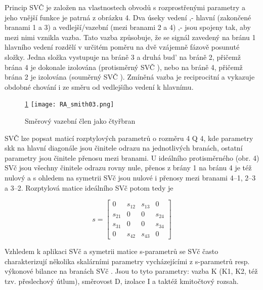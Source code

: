         Princip SVČ je založen na vlastnostech obvodů s rozprostřenými parametry a jeho vnější 
        funkce je patrná z obrázku 4. Dva úseky vedení ‚- hlavní (zakončené branami 1 a 3) a 
        vedlejší/vazební (mezi branami 2 a 4) ‚- jsou spojeny tak, aby mezi nimi vznikla vazba. 
        Tato vazba způsobuje, že se signál zavedený na bránu 1 hlavního vedení rozdělí v určitém 
        poměru na dvě vzájemně fázově posunuté složky. Jedna složka vystupuje na bráně 3 a druhá 
        bud’ na bráně 2, přičemž brána 4 je dokonale izolována (protisměrný SVČ ), nebo na bráně 4, 
        přičemž brána 2 je izolována (souměrný SVČ ). Zmíněná vazba je reciprocitní a vykazuje 
        obdobné chování i ze směru od vedlejšího vedení k hlavnímu.      
  
        \begin{figure}\ref{fyz:fig_RA_smith03} 
          \centering
          \texttt{[image: RA\_smith03.png]}
          \caption{Směrový vazební člen jako čtyřbran}
          \label{fyz:fig_RA_smith03} 
        \end{figure}
  
        SVČ lze popsat maticí rozptylových parametrů o rozměru 4 Q 4, kde parametry skk na hlavní 
        diagonále jsou činitele odrazu na jednotlivých branách, ostatní parametry jsou činitele 
        přenosu mezi branami. U ideálního protisměrného (obr. 4) SVč jsou všechny činitele odrazu 
        rovny nule, přenos z brány 1 na bránu 4 je též nulový a s ohledem na symetrii SVč jsou 
        nulové i přenosy mezi branami 4–1, 2–3 a 3–2. Rozptylová matice ideálního SVč potom tedy je
  
        \begin{equation}\label{RA:eq_smith09}
          s = \left[
            \begin{matrix}
                0    & s_{12} & s_{13} &  0       \\
              s_{21} &   0    &   0    & s_{24}   \\
              s_{31} &   0    &   0    & s_{34}   \\
                0    & s_{42} & s_{43} &  0     
            \end{matrix}
              \right]
        \end{equation} 
  
        Vzhledem k aplikaci SVč a symetrii matice s-parametrů se SVč často charakterizují několika 
        skalárními parametry vycházejícími z s-parametrů resp. výkonové bilance na branách SVč . 
        Jsou to tyto parametry: vazba K (K1, K2, též tzv. přeslechový útlum), směrovost D, izolace 
        I a taktéž kmitočtový rozsah.
  
